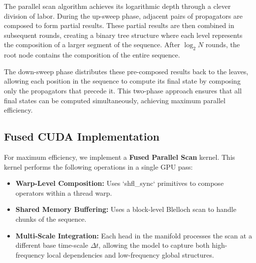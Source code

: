\documentclass[12pt,a4paper]{article}
\begin{document}
The parallel scan algorithm achieves its logarithmic depth through a clever division of labor. During the up-sweep phase, adjacent pairs of propagators are composed to form partial results. These partial results are then combined in subsequent rounds, creating a binary tree structure where each level represents the composition of a larger segment of the sequence. After $\log_2 N$ rounds, the root node contains the composition of the entire sequence.

The down-sweep phase distributes these pre-composed results back to the leaves, allowing each position in the sequence to compute its final state by composing only the propagators that precede it. This two-phase approach ensures that all final states can be computed simultaneously, achieving maximum parallel efficiency.

\subsection{Fused CUDA Implementation}

For maximum efficiency, we implement a \textbf{Fused Parallel Scan} kernel. This kernel performs the following operations in a single GPU pass:

\begin{itemize}[leftmargin=1.5cm]
\item \textbf{Warp-Level Composition:} Uses `shfl_sync` primitives to compose operators within a thread warp.
\item \textbf{Shared Memory Buffering:} Uses a block-level Blelloch scan to handle chunks of the sequence.
\item \textbf{Multi-Scale Integration:} Each head in the manifold processes the scan at a different base time-scale $\Delta t$, allowing the model to capture both high-frequency local dependencies and low-frequency global structures.
\end{itemize}
\end{document}
